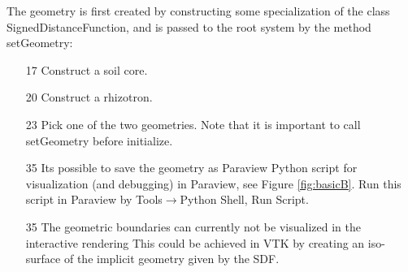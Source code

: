 

The geometry is first created by constructing some specialization of the class SignedDistanceFunction, 
and is passed to the root system by the method setGeometry: 
\begin{itemize}
 \item[17] Construct a soil core. 
 \item[20] Construct a rhizotron.
 \item[23] Pick one of the two geometries. Note that it is important to call setGeometry before initialize.
 \item[35] Its possible to save the geometry as Paraview Python script for visualization (and debugging) in Paraview, 
 see Figure \ref{fig:basicB}. Run this script in Paraview by Tools$\rightarrow$Python Shell, Run Script.
\item[35] The geometric boundaries can currently not be visualized in the interactive rendering 
This could be achieved in VTK by creating an iso-surface of the implicit geometry given by the SDF.
\end{itemize}

